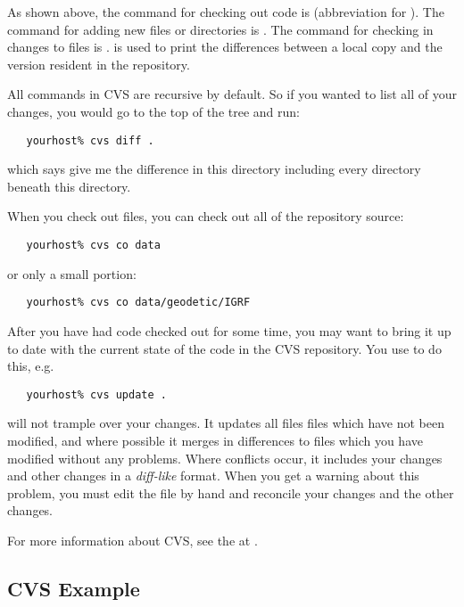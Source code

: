 \noindent
As shown above, the command for checking out code is  (abbreviation
for ). The command for adding new files or directories is
. The command for checking in changes to files is .
 is used to print the differences between a local copy and the
version resident in the repository.

All commands in CVS are recursive by default. So if you wanted to list all
of your changes, you would go to the top of the tree and run:

\begin{verbatim}
   yourhost% cvs diff .
\end{verbatim}

\noindent
which says give me the difference in this directory including every
directory beneath this directory.

When you check out files, you can check out all of the repository source:

\begin{verbatim}
   yourhost% cvs co data
\end{verbatim}

\noindent
or only a small portion:

\begin{verbatim}
   yourhost% cvs co data/geodetic/IGRF
\end{verbatim}

After you have had code checked out for some time, you may want to bring it
up to date with the current state of the code in the CVS repository. You use
 to do this, e.g.

\begin{verbatim}
   yourhost% cvs update .
\end{verbatim}

\noindent
{} will not trample over your changes. It updates all files
files which have not been modified, and where possible it merges in
differences to files which you have modified without any problems. Where
conflicts occur, it includes your changes and other changes in
a \textit{diff-like} format. When you get a warning about this problem,
you must edit the file by hand and reconcile your changes and the other
changes.

For more information about CVS, see
the 
at .

\subsection*{CVS Example}
\label{data repository cvs example}

